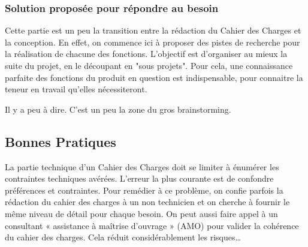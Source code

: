 \subsubsection{Solution proposée pour répondre au besoin}

Cette partie est un peu la transition entre la rédaction du Cahier des Charges et la conception. En effet, on commence ici à proposer des pistes de recherche pour la réalisation de chacune des fonctions.
L'objectif est d'organiser au mieux la suite du projet, en le découpant en "sous projets". Pour cela, une connaissance parfaite des fonctions du produit en question est indispensable, pour connaitre la teneur en travail qu'elles nécessiteront.

Il y a peu à dire. C'est un peu la zone du gros brainstorming.         


\subsection{Bonnes Pratiques}
La partie technique d’un Cahier des Charges doit se limiter à énumérer les contraintes techniques avérées.
L’erreur la plus courante est de confondre préférences et contraintes. 
Pour remédier à ce problème, on confie parfois la rédaction du cahier des charges à un non technicien et on cherche à fournir le même niveau de détail pour chaque besoin.
On peut aussi faire appel à un consultant « assistance à maîtrise d’ouvrage » (AMO) pour valider la cohérence du cahier des charges. Cela réduit considérablement les risques…
